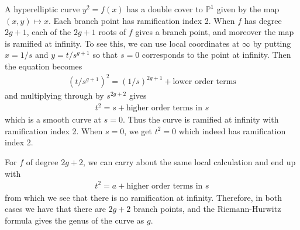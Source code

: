 \documentclass[12pt]{article}
\begin{document}
\begin{example}
A hyperelliptic curve $y^2 = f(x)$ has a double cover to $\mathbb{P}^1$ given by the map $(x,y)\mapsto x$. Each 
branch point has ramification index 2. When $f$ has degree $2g+1$, each of the $2g+1$ roots of $f$ gives a branch point, and moreover the map is ramified at infinity. To see this, we can use local coordinates at $\infty$ by putting $x = 1/s$ and $y = t/s^{g+1}$ so that $s = 0$ corresponds to the point at infinity. Then the equation becomes \begin{align*}
    (t/s^{g+1})^2 = (1/s)^{2g+1} + {\text{lower order terms}}
    \end{align*} and multiplying through by $s^{2g+2}$ gives \begin{align*}
        t^2 = s + {\text{higher order terms in $s$}}
    \end{align*} which is a smooth curve at $s=0$. Thus the curve is ramified at infinity with ramification index 2. When $s=0$, we get $t^2=0$ which indeed has ramification index 2.

For $f$ of degree $2g+2$, we can carry about the same local calculation and end up with \begin{align*}
    t^2 = a + {\text{higher order terms in $s$}}
\end{align*} from which we see that there is no ramification at infinity. Therefore, in both cases we have that there are $2g+2$ branch points, and the Riemann-Hurwitz formula gives the genus of the curve as $g$.

\end{example}
\end{document}
